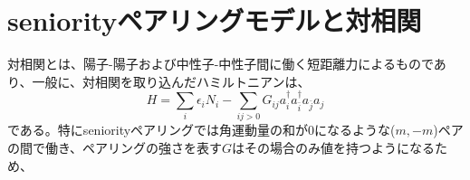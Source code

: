 \documentclass[a4paper,11pt]{jsreport}
\begin{document}
  \section{seniorityペアリングモデルと対相関}
  対相関とは、陽子-陽子および中性子-中性子間に働く短距離力によるものであり、一般に、対相関を取り込んだハミルトニアンは、
  \begin{equation}
    H=\sum_{i}\epsilon_i N_i - \sum_{ij>0}G_{ij} a^{\dagger}_{i}a^{\dagger}_{\bar{i}}a_{\bar{j}}a_{j}
  \end{equation}
  である。特にseniorityペアリングでは角運動量の和が0になるような(\(m,-m\))ペアの間で働き、ペアリングの強さを表す\(G\)はその場合のみ値を持つようになるため、
\end{document}
